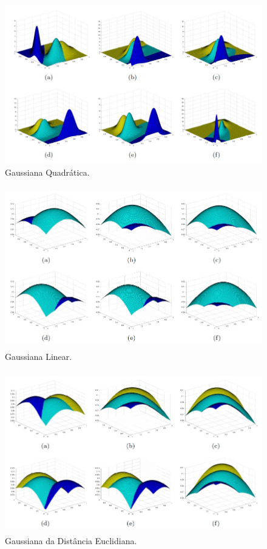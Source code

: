 \documentclass[a4paper]{article}
\begin{document}
\begin{figure}[H]
\centering

\includegraphics[height=7cm]{Imagens/plotGauss_type1.jpg}

\caption{Gaussiana Quadrática.}
\label{fig:Figura5}
\end{figure}


\begin{figure}[H]
\centering

\includegraphics[height=7cm]{Imagens/plotGauss_type2.jpg}

\caption{Gaussiana Linear.}
\label{fig:Figura6}
\end{figure}


\begin{figure}[H]
\centering

\includegraphics[height=7cm]{Imagens/plotGauss_type3.jpg}

\caption{Gaussiana da Distância Euclidiana.}
\label{fig:Figura7}
\end{figure}
\end{document}

